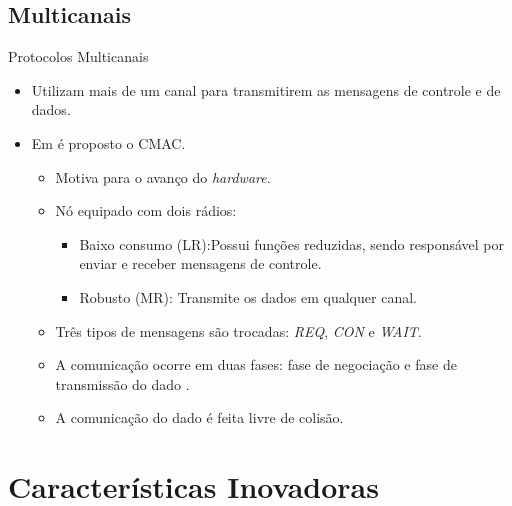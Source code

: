 \documentclass{beamer}
\begin{document}
\subsection{Multicanais}
\begin{frame}{Protocolos Multicanais}
  \hypertarget{cmac_back}{}
  \begin{itemize}
    \item Utilizam mais de um canal para transmitirem as mensagens de controle e de dados.
    \item Em \cite{20084511683228} é proposto o CMAC.
    \begin{itemize}
      \item Motiva para o avanço do \emph{hardware}.
      \item Nó equipado com dois rádios:
      \begin{itemize}
	\item Baixo consumo (LR):Possui funções reduzidas, sendo responsável por enviar e receber mensagens de controle.
	\item Robusto (MR): Transmite os dados em qualquer canal.
      \end{itemize}
      \item Três tipos de mensagens são trocadas: \emph{REQ}, \emph{CON} e \emph{WAIT}.
      \item A comunicação ocorre em duas fases: fase de negociação e fase de transmissão do dado \hyperlink{cmac}{}.
      \item A comunicação do dado é feita livre de colisão.
    \end{itemize}
  \end{itemize}
\end{frame}

\section{Características Inovadoras}
\end{document}

